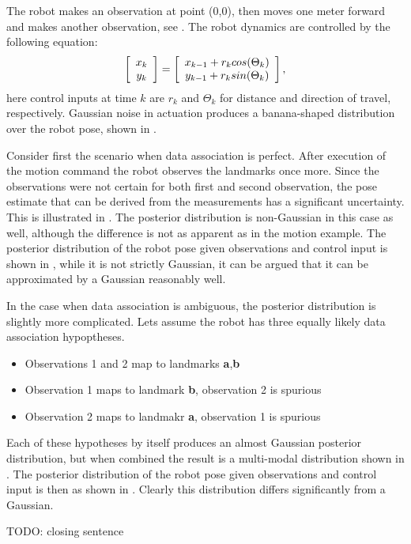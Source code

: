 The robot makes an observation at point (0,0), then moves one meter
forward and makes another observation,
see . The robot dynamics are controlled by
the following equation:
$$
  \left[\begin{array}{c} x_k\\y_k \end{array} \right] = \left[\begin{array}{c}  x_{k-1} + r_k cos(\Theta_k)\\
                               y_{k-1} + r_k sin(\Theta_k)  \end{array} \right],
$$
here control inputs at time $k$ are $r_k$ and $\Theta_k$ for distance
and direction of travel, respectively. Gaussian noise in actuation
produces a banana-shaped distribution over the robot pose, shown in
.

Consider first the scenario when data association is perfect. After
execution of the motion command the robot observes the landmarks once
more. Since the observations were not certain for both first and
second observation, the pose estimate that can be derived from the
measurements has a significant uncertainty. This is illustrated in
. The posterior distribution is non-Gaussian
in this case as well, although the difference is not as apparent as in
the motion example. The posterior distribution of the robot pose given
observations and control input is shown in
, while it is not strictly Gaussian, it can
be argued that it can be approximated by a Gaussian reasonably well.

In the case when data association is ambiguous, the posterior
distribution is slightly more complicated. Lets assume the robot has
three equally likely data association hypoptheses. 

\begin{itemize}
\item Observations 1 and 2 map to landmarks {\bf a},{\bf b}
\item Observation 1 maps to landmark {\bf b}, observation 2 is spurious
\item Observation 2 maps to landmakr {\bf a}, observation 1 is spurious
\end{itemize}

Each of these hypotheses by itself produces an almost Gaussian
posterior distribution, but when combined the result is a multi-modal
distribution shown in . The posterior
distribution of the robot pose given observations and control input is
then as shown in . Clearly this
distribution differs significantly from a Gaussian.

TODO: closing sentence


